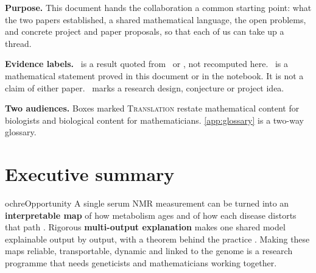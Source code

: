 \documentclass[11pt,a4paper]{article}
\newenvironment{opportunity}{\begin{callout}{ochre}{Opportunity}}{\end{callout}}
\theoremstyle{plain}
\theoremstyle{definition}
\theoremstyle{remark}
\newcommand{\tagbox}[2]{\tcbox[on line,boxsep=1pt,left=2pt,right=2pt,top=0pt,bottom=0pt,
  colback=#1!12!white,colframe=#1,boxrule=0.4pt,arc=1pt]{\scriptsize\bfseries\color{#1}#2}}
\newcommand{\REP}{\tagbox{teal}{REPORTED}}
\newcommand{\PROP}{\tagbox{ochre}{PROPOSAL}}
\newcommand{\NEW}{\tagbox{plum}{NEW HERE}}
\begin{document}
\begin{titlepage}
\vspace{1.2em}
\begin{tcolorbox}[colback=white,colframe=slate,boxrule=0.4pt,arc=2pt,title={\small\bfseries How to read this document},colbacktitle=slate!10!white,coltitle=navy]
\small
\textbf{Purpose.} This document hands the collaboration a common starting point: what the two papers established, a shared mathematical language, the open problems, and concrete project and paper proposals, so that each of us can take up a thread.

\textbf{Evidence labels.} \REP\ is a result quoted from \PI\ or \PII, not recomputed here. \NEW\ is a mathematical statement proved in this document or in the notebook. It is not a claim of either paper. \PROP\ marks a research design, conjecture or project idea.

\textbf{Two audiences.} Boxes marked \textsc{Translation} restate mathematical content for biologists and biological content for mathematicians. \cref{app:glossary} is a two-way glossary.
\end{tcolorbox}
\end{titlepage}

\tableofcontents
\newpage

\section{Executive summary}
\label{sec:summary}

\begin{opportunity}
A single serum NMR measurement can be turned into an \textbf{interpretable map} of how metabolism ages and of how each disease distorts that path \PI. Rigorous \textbf{multi-output explanation} makes one shared model explainable output by output, with a theorem behind the practice \PII. Making these maps reliable, transportable, dynamic and linked to the genome is a research programme that needs geneticists and mathematicians working together.
\end{opportunity}
\end{document}
